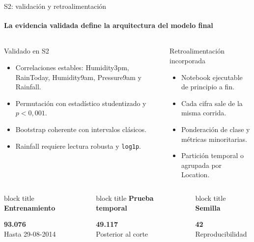 \documentclass[aspectratio=169,10pt]{beamer}
\newcommand{\metric}[3]{%
  \begingroup
  \setlength{\fboxsep}{0pt}%
  \colorbox{panel}{%
    \begin{minipage}[t][1.85cm][c]{\linewidth}
      \begin{beamercolorbox}[wd=\linewidth,ht=0.45cm,dp=0.12cm,leftskip=0.12cm]{block title}
        \scriptsize\bfseries #1
      \end{beamercolorbox}
      \vspace{0.08cm}
      \centering
      {\Large\bfseries #2}\\[-1pt]
      {\scriptsize #3}
    \end{minipage}%
  }%
  \endgroup
}
\begin{document}
\begin{frame}{S2: validación y retroalimentación}
\framesubtitle{La evidencia validada define la arquitectura del modelo final}
\begin{columns}[T,onlytextwidth]
\begin{block}{Validado en S2}
\begin{itemize}
\item Correlaciones estables: Humidity3pm, RainToday, Humidity9am, Pressure9am y Rainfall.
\item Permutación con estadístico studentizado y $p<0{,}001$.
\item Bootstrap coherente con intervalos clásicos.
\item Rainfall requiere lectura robusta y \texttt{log1p}.
\end{itemize}
\end{block}
\begin{block}{Retroalimentación incorporada}
\begin{itemize}
\item Notebook ejecutable de principio a fin.
\item Cada cifra sale de la misma corrida.
\item Ponderación de clase y métricas minoritarias.
\item Partición temporal o agrupada por Location.
\end{itemize}
\end{block}
\end{columns}
\begin{columns}[T,onlytextwidth]
\metric{Entrenamiento}{93.076}{Hasta 29-08-2014}
\metric{Prueba temporal}{49.117}{Posterior al corte}
\metric{Semilla}{42}{Reproducibilidad}
\end{columns}
\end{frame}
\end{document}
